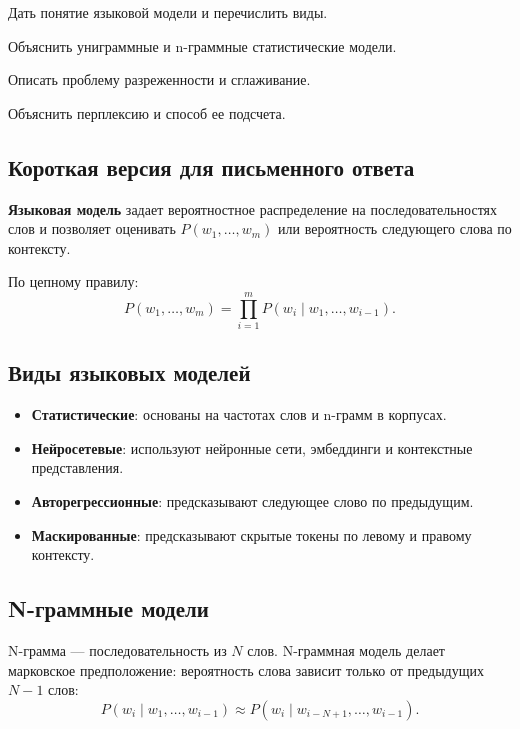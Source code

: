 
\begin{examplan}
    \item Дать понятие языковой модели и перечислить виды.
    \item Объяснить униграммные и n-граммные статистические модели.
    \item Описать проблему разреженности и сглаживание.
    \item Объяснить перплексию и способ ее подсчета.
\end{examplan}

\subsection*{Короткая версия для письменного ответа}

\textbf{Языковая модель} задает вероятностное распределение на последовательностях слов и позволяет оценивать $P(w_1,\ldots,w_m)$ или вероятность следующего слова по контексту.

По цепному правилу:
\[
P(w_1,\ldots,w_m)=\prod_{i=1}^{m}P(w_i\mid w_1,\ldots,w_{i-1}).
\]

\subsection*{Виды языковых моделей}

\begin{itemize}
    \item \textbf{Статистические}: основаны на частотах слов и n-грамм в корпусах.
    \item \textbf{Нейросетевые}: используют нейронные сети, эмбеддинги и контекстные представления.
    \item \textbf{Авторегрессионные}: предсказывают следующее слово по предыдущим.
    \item \textbf{Маскированные}: предсказывают скрытые токены по левому и правому контексту.
\end{itemize}

\subsection*{N-граммные модели}

N-грамма --- последовательность из $N$ слов. N-граммная модель делает марковское предположение: вероятность слова зависит только от предыдущих $N-1$ слов:
\[
P(w_i\mid w_1,\ldots,w_{i-1})\approx P(w_i\mid w_{i-N+1},\ldots,w_{i-1}).
\]

